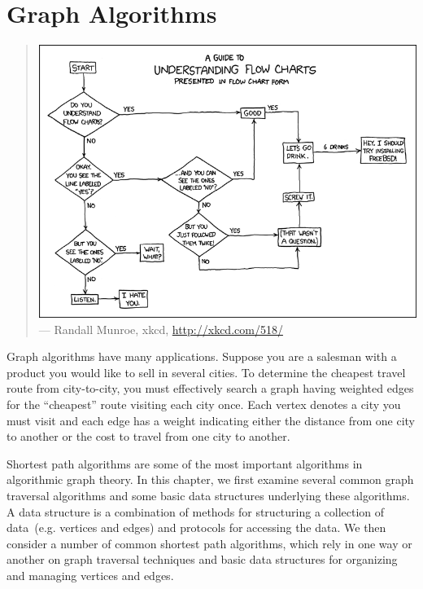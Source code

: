 
\chapter{Graph Algorithms}
\label{chap:graph_algorithms}

\begin{quote}
\includegraphics[scale=0.5]{image/graph-algorithms/flow-charts} \\
\noindent
--- Randall Munroe, xkcd,
\url{http://xkcd.com/518/}
\end{quote}

\noindent
Graph algorithms have many applications. Suppose you are a
salesman with a product you would
like to sell in several cities. To determine the cheapest travel route
from city-to-city, you must effectively search a graph having weighted
edges for the ``cheapest'' route visiting each city once. Each vertex
denotes a city you must visit and each edge has a weight indicating
either the distance from one city to another or the
cost to travel from one city to another.

Shortest path algorithms are some of the most
important algorithms in algorithmic graph theory. In this chapter, we
first examine several common graph traversal algorithms and some basic
data structures underlying these algorithms. A
data structure is a combination of methods for structuring a
collection of data~(e.g. vertices and edges) and protocols for
accessing the data. We then consider a number of common shortest path
algorithms, which rely in one way or another on graph traversal
techniques and basic data structures for organizing and managing
vertices and edges.


